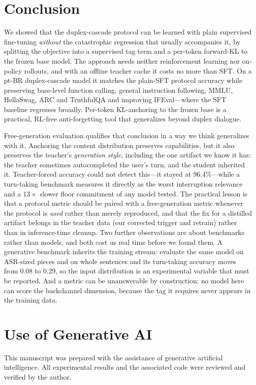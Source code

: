 \documentclass[conference]{IEEEtran}
\begin{document}
\section{Conclusion}
We showed that the duplex-cascade protocol can be learned with plain supervised
fine-tuning \emph{without} the catastrophic regression that usually accompanies it,
by splitting the objective into a supervised tag term and a per-token forward-KL to
the frozen base model. The approach needs neither reinforcement learning nor on-policy
rollouts, and with an offline teacher cache it costs no more than SFT. On a pt-BR
duplex-cascade model it matches the plain-SFT protocol accuracy while preserving
base-level function calling, general instruction following, MMLU, HellaSwag, ARC and
TruthfulQA and improving IFEval---where the SFT baseline regresses broadly. Per-token
KL-anchoring to the frozen base is a practical, RL-free anti-forgetting tool that
generalizes beyond duplex dialogue.

Free-generation evaluation qualifies that conclusion in a way we think generalizes
with it. Anchoring the content distribution preserves capabilities, but it also
preserves the teacher's \emph{generation style}, including the one artifact we know it
has: the teacher sometimes autocompleted the user's turn, and the student inherited
it. Teacher-forced accuracy could not detect this---it stayed at 96.4\%---while a
turn-taking benchmark measures it directly as the worst interruption relevance and a
$13\times$ slower floor commitment of any model tested. The practical lesson is that a
protocol metric should be paired with a free-generation metric whenever the protocol is
\emph{used} rather than merely reproduced, and that the fix for a distilled artifact
belongs in the teacher data (our corrected trigger and retrain) rather than in
inference-time cleanup. Two further observations are about benchmarks rather than
models, and both cost us real time before we found them. A generative benchmark
inherits the training stream: evaluate the same model on ASR-sized pieces and on whole sentences and its
turn-taking accuracy moves from 0.08 to 0.29, so the input distribution is an
experimental variable that must be reported. And a metric can be unanswerable by
construction: no model here can score the backchannel dimension, because the tag it
requires never appears in the training data.

\section*{Use of Generative AI}
This manuscript was prepared with the assistance of generative artificial
intelligence. All experimental results and the associated code were reviewed
and verified by the author.
\end{document}
